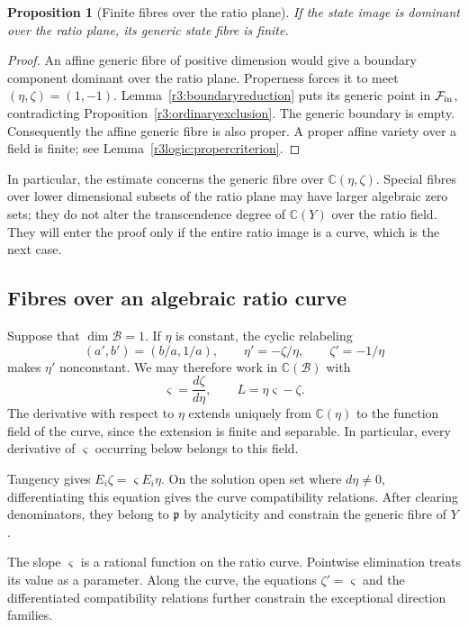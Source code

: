 \documentclass[11pt,a4paper]{article}
\numberwithin{equation}{section}
\theoremstyle{plain}
\newtheorem{proposition}[theorem]{Proposition}
\theoremstyle{definition}
\theoremstyle{remark}
\begin{document}
\begin{proposition}[Finite fibres over the ratio plane]
\label{r3:dominantfinite}
If the state image is dominant over the ratio plane, its generic
state fibre is finite.
\end{proposition}
\begin{proof}
An affine generic fibre of positive dimension would give a boundary
component dominant over the ratio plane. Properness forces it to
meet $(\eta,\zeta)=(1,-1)$. Lemma~\ref{r3:boundaryreduction} puts its
generic point in $\mathcal F_{\rm in}$, contradicting
Proposition~\ref{r3:ordinaryexclusion}. The generic boundary is empty.
Consequently the affine generic fibre is also proper. A proper affine
variety over a field is finite; see
Lemma~\ref{r3logic:propercriterion}.
\end{proof}

In particular, the estimate concerns the generic fibre over
$\mathbb C(\eta,\zeta)$. Special fibres over lower dimensional
subsets of the ratio plane may have larger algebraic zero sets;
they do not alter the transcendence degree of $\mathbb C(Y)$
over the ratio field. They will enter the proof only if the
entire ratio image is a curve, which is the next case.

\subsection{Fibres over an algebraic ratio curve}\label{r3:curves}

Suppose that $\dim\mathscr B=1$. If $\eta$ is constant, the cyclic
relabeling
\[
 (a',b')=(b/a,1/a),\qquad
 \eta'=-\zeta/\eta,\qquad \zeta'=-1/\eta
\]
makes $\eta'$ nonconstant. We may therefore work in
$\mathbb C(\mathscr B)$ with
\[
 \varsigma=\frac{d\zeta}{d\eta},\qquad
 L=\eta\varsigma-\zeta.
\]
The derivative with respect to $\eta$ extends uniquely from
$\mathbb C(\eta)$ to the function field of the curve, since the
extension is finite and separable. In particular, every derivative
of $\varsigma$ occurring below belongs to this field.

Tangency gives $E_i\zeta=\varsigma E_i\eta$. On the solution open
set where $d\eta\ne0$, differentiating this equation gives the
curve compatibility relations. After clearing denominators, they
belong to $\mathfrak p$ by analyticity and constrain the generic
fibre of $Y$.

The slope $\varsigma$ is a rational function on the ratio curve.
Pointwise elimination treats its value as a parameter. Along the
curve, the equations $\zeta'=\varsigma$ and the differentiated
compatibility relations further constrain the exceptional
direction families.
\end{document}
